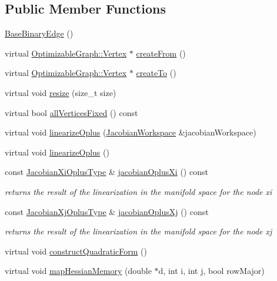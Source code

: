 \subsection*{Public Member Functions}
\begin{DoxyCompactItemize}
\item 
\hyperlink{classg2o_1_1BaseBinaryEdge_aacfc6e1d439f2f0fb09c6b069f478cf4}{Base\+Binary\+Edge} ()
\item 
virtual \hyperlink{classg2o_1_1OptimizableGraph_1_1Vertex}{Optimizable\+Graph\+::\+Vertex} $\ast$ \hyperlink{classg2o_1_1BaseBinaryEdge_a32bfc93b6dede619c7d99db2fb60f80d}{create\+From} ()
\item 
virtual \hyperlink{classg2o_1_1OptimizableGraph_1_1Vertex}{Optimizable\+Graph\+::\+Vertex} $\ast$ \hyperlink{classg2o_1_1BaseBinaryEdge_ac7cce17e3229445e5a33c3cb8a569320}{create\+To} ()
\item 
virtual void \hyperlink{classg2o_1_1BaseBinaryEdge_a06e64067fa5fff4a5e2d058249b55478}{resize} (size\+\_\+t size)
\item 
virtual bool \hyperlink{classg2o_1_1BaseBinaryEdge_a1895c3b7141e93fd05bf271daeda7568}{all\+Vertices\+Fixed} () const 
\item 
virtual void \hyperlink{classg2o_1_1BaseBinaryEdge_afc3b6470e7679f027c2614484b394925}{linearize\+Oplus} (\hyperlink{classg2o_1_1JacobianWorkspace}{Jacobian\+Workspace} \&jacobian\+Workspace)
\item 
virtual void \hyperlink{classg2o_1_1BaseBinaryEdge_af0fb8a693c8c7996fa65566e7263fbc4}{linearize\+Oplus} ()
\item 
const \hyperlink{classg2o_1_1BaseBinaryEdge_ab1cde84224b129603bcd95db027e0167}{Jacobian\+Xi\+Oplus\+Type} \& \hyperlink{classg2o_1_1BaseBinaryEdge_ad036a59a5bc1d04d1799d61b9be15864}{jacobian\+Oplus\+Xi} () const 
\begin{DoxyCompactList}\small\item\em returns the result of the linearization in the manifold space for the node xi \end{DoxyCompactList}\item 
const \hyperlink{classg2o_1_1BaseBinaryEdge_a83e5dec2135b33e86255c87be3b5d062}{Jacobian\+Xj\+Oplus\+Type} \& \hyperlink{classg2o_1_1BaseBinaryEdge_a8a8ed568c4a00f74943fc1efe5bbc72c}{jacobian\+Oplus\+Xj} () const 
\begin{DoxyCompactList}\small\item\em returns the result of the linearization in the manifold space for the node xj \end{DoxyCompactList}\item 
virtual void \hyperlink{classg2o_1_1BaseBinaryEdge_a06a18745d95017c6d3c841f838a65364}{construct\+Quadratic\+Form} ()
\item 
virtual void \hyperlink{classg2o_1_1BaseBinaryEdge_ada358930854d386a4e8c32f64078e052}{map\+Hessian\+Memory} (double $\ast$d, int i, int j, bool row\+Major)
\end{DoxyCompactItemize}

